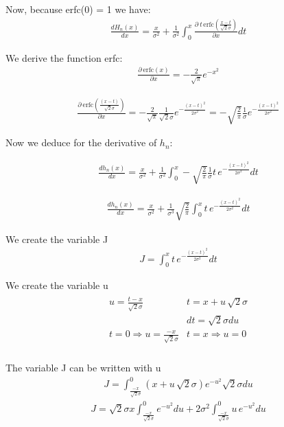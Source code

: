 Now, because erfc(0) = 1  we have:
\begin{eqnarray}
\frac{d H_{n}(x)}{dx} = 
\frac{x}{\sigma^{2}}   +
\frac{1}{\sigma^{2}}\int_{0}^{x} 
          \frac{ \partial \: t \, \mbox{erfc} (\frac{x-t}{\sqrt{2}\sigma})}{ \partial x} dt 
\end{eqnarray}

We derive the function erfc:
\begin{eqnarray}
\frac{\partial \: \mbox{erfc}(x)}{\partial x} = - \frac{2}{\sqrt{\pi}}   e^{-x^{2}} 
\end{eqnarray}

\begin{eqnarray}
\frac{ \partial\:  \mbox{erfc}( \frac{(x-t)}{\sqrt{2}\sigma} )}{\partial x} = 
-\frac{2}{\sqrt{\pi}} \frac{1}{\sqrt{2}\sigma}  
  e^{-\frac{(x-t)^{2}}{2\sigma^{2}}} =
 -\sqrt{\frac{2}{\pi}} \frac{1}{\sigma} e^{-\frac{(x-t)^{2}}{2\sigma^{2}}}
\end{eqnarray}

Now we deduce for the derivative of $h_n$:

\begin{eqnarray}
\frac{d h_{n}(x)}{dx} = 
\frac{x}{\sigma^{2}}   +
\frac{1}{\sigma^{2}}\int_{0}^{x} 
 -\sqrt{\frac{2}{\pi}}\frac{1}{\sigma}t \, e^{-\frac{(x-t)^{2}}{2\sigma^{2}}}dt 
\end{eqnarray}

\begin{eqnarray}
\frac{d h_{n}(x)}{dx} = 
\frac{x}{\sigma^{2}}   +
\frac{1}{\sigma^{3}}\sqrt{\frac{2}{\pi}} \int_{0}^{x} t \, e^{-\frac{(x-t)^{2}}{2\sigma^{2}}}dt 
\end{eqnarray}

We create the variable J
\begin{eqnarray}
J = \int_{0}^{x} t \, e^{-\frac{(x-t)^{2}}{2\sigma^{2}}}dt 
\end{eqnarray}

We create the variable u
\begin{eqnarray}
\begin{array}{cc} 
  u = \frac{t-x}{\sqrt{2}\sigma}  &  t = x+u \, \sqrt{2}\sigma         \\
   & dt = \sqrt{2}\sigma du         \\
  t=0 \Rightarrow u = \frac{-x}{\sqrt{2}\sigma}  &
  t=x \Rightarrow u = 0                     \\
   \end{array}
\end{eqnarray}


The variable J can be written with u
\begin{eqnarray}
 J = \int_{\frac{-x}{\sqrt{2}\sigma} }^{0} (x+u \,\sqrt{2}\sigma) e^{-u^{2}}\sqrt{2}\sigma du
\end{eqnarray}
\begin{eqnarray}
 J = \sqrt{2}\sigma x \int_{\frac{-x}{\sqrt{2}\sigma} }^{0} 
 e^{-u^{2}} du  +
 2 \sigma^{2} \int_{\frac{-x}{\sqrt{2}\sigma} }^{0} u \,
 e^{-u^{2}} du
\end{eqnarray}

